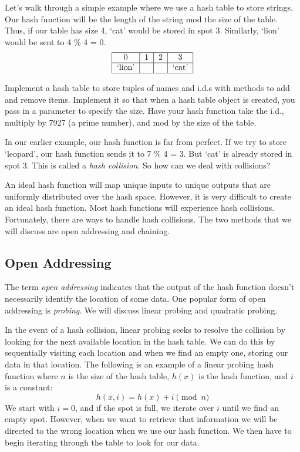 Let's walk through a simple example where we use a hash table to store strings.
Our hash function will be the length of the string mod the size of the table.
Thus, if our table has size 4, `cat' would be stored in spot 3.
Similarly, `lion' would be sent to 4 \% 4 = 0.
\[
\begin{tabular}{|c|c|c|c|}
\hline
0 & 1 & 2 & 3\\
\hline
`lion' & & & `cat' \\
\hline
\end{tabular}
\]


\begin{problem}
Implement a hash table to store tuples of names and i.d.s with methods to add and remove items.
Implement it so that when a hash table object is created, you pass in a parameter to specify the size.
Have your hash function take the i.d., multiply by 7927 (a prime number), and mod by the size of the table.
\label{prob:Hash1}
\end{problem}

In our earlier example, our hash function is far from perfect.
If we try to store `leopard', our hash function sends it to 7 \% 4 = 3.
But `cat' is already stored in spot 3.
This is called a \emph{hash collision}.
So how can we deal with collisions?

An ideal hash function will map unique inputs to unique outputs that are uniformly distributed over the hash space.
However, it is very difficult to create an ideal hash function.
Most hash functions will experience hash collisions.
Fortunately, there are ways to handle hash collisions.
The two methods that we will discuss are open addressing and chaining.

\subsection*{Open Addressing}
The term \emph{open addressing} indicates that the output of the hash function doesn't necessarily identify the location of some data.
One popular form of open addressing is \emph{probing}.
We will discuss linear probing and quadratic probing.

In the event of a hash collision, linear probing seeks to resolve the collision by looking for the next available location in the hash table.
We can do this by sequentially visiting each location and when we find an empty one, storing our data in that location.
The following is an example of a linear probing hash function where $n$ is the size of the hash table, $h(x)$ is the hash function, and $i$ is a constant:
\begin{equation*}
h(x, i) = h(x) + i \pmod{n}
\end{equation*}
We start with $i = 0$, and if the spot is full, we iterate over $i$ until we find an empty spot.
However, when we want to retrieve that information we will be directed to the wrong location when we use our hash function.
We then have to begin iterating through the table to look for our data.

